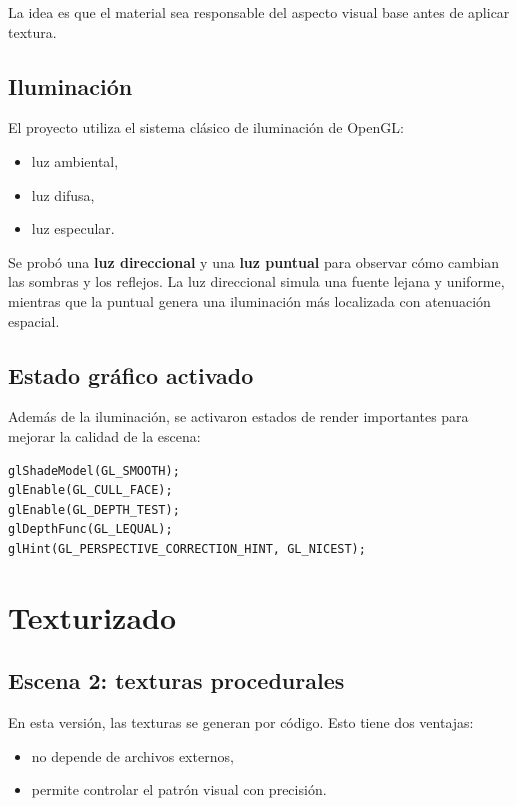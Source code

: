 \documentclass[12pt,a4paper]{article}
\begin{document}
La idea es que el material sea responsable del aspecto visual base antes de
aplicar textura.

\subsection{Iluminación}

El proyecto utiliza el sistema clásico de iluminación de OpenGL:

\begin{itemize}[noitemsep]
  \item luz ambiental,
  \item luz difusa,
  \item luz especular.
\end{itemize}

Se probó una \textbf{luz direccional} y una \textbf{luz puntual} para observar
cómo cambian las sombras y los reflejos. La luz direccional simula una fuente
lejana y uniforme, mientras que la puntual genera una iluminación más localizada
con atenuación espacial.

\subsection{Estado gráfico activado}

Además de la iluminación, se activaron estados de render importantes para mejorar
la calidad de la escena:

\begin{lstlisting}[style=output]
glShadeModel(GL_SMOOTH);
glEnable(GL_CULL_FACE);
glEnable(GL_DEPTH_TEST);
glDepthFunc(GL_LEQUAL);
glHint(GL_PERSPECTIVE_CORRECTION_HINT, GL_NICEST);
\end{lstlisting}

\section{Texturizado}

\subsection{Escena 2: texturas procedurales}

En esta versión, las texturas se generan por código. Esto tiene dos ventajas:

\begin{itemize}[noitemsep]
  \item no depende de archivos externos,
  \item permite controlar el patrón visual con precisión.
\end{itemize}
\end{document}
